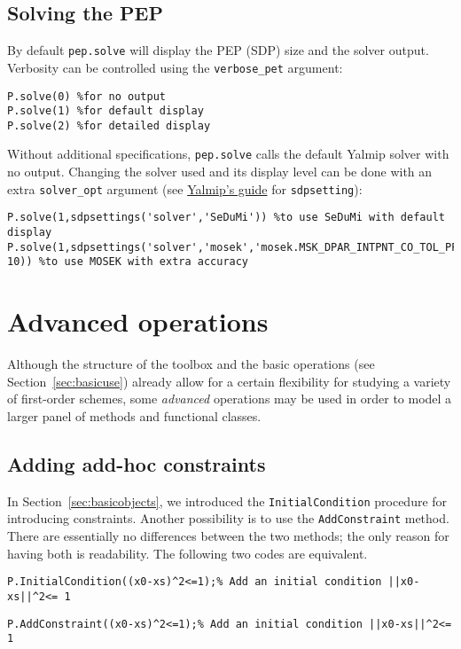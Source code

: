 \documentclass[11pt,a4paper]{article}
\begin{document}
\subsection{Solving the PEP}
By default \verb|pep.solve| will display the PEP (SDP) size and the solver output.
Verbosity can be controlled using the \verb?verbose_pet? argument:
\begin{lstlisting}
P.solve(0) %for no output
P.solve(1) %for default display
P.solve(2) %for detailed display
\end{lstlisting}
Without additional specifications, \verb|pep.solve| calls the default Yalmip solver with no output.
Changing the solver used and its display level can be done with an extra \verb|solver_opt| argument (see \href{https://yalmip.github.io/command/sdpsettings/}{Yalmip's guide} for \verb|sdpsetting|):
\begin{lstlisting}
P.solve(1,sdpsettings('solver','SeDuMi')) %to use SeDuMi with default display
P.solve(1,sdpsettings('solver','mosek','mosek.MSK_DPAR_INTPNT_CO_TOL_PFEAS',1e-10)) %to use MOSEK with extra accuracy
\end{lstlisting}



\section{Advanced operations}		%

Although the structure of the toolbox and the basic operations (see Section~\ref{sec:basicuse}) already allow for a certain flexibility for studying a variety of first-order schemes, some \emph{advanced} operations may be used in order to model a larger panel of methods and functional classes.

\subsection{Adding add-hoc constraints}\label{sec:constraints}
In Section~\ref{sec:basicobjects}, we introduced the \verb?InitialCondition? procedure for introducing constraints. Another possibility is to use the \verb?AddConstraint? method. There are essentially no differences between the two methods; the only reason for having both is readability. The following two codes are equivalent.\\[-1cm]
\begin{lstlisting}
P.InitialCondition((x0-xs)^2<=1);% Add an initial condition ||x0-xs||^2<= 1
\end{lstlisting}\vspace{-.5cm}
\begin{lstlisting}
P.AddConstraint((x0-xs)^2<=1);% Add an initial condition ||x0-xs||^2<= 1
\end{lstlisting}
\end{document}
